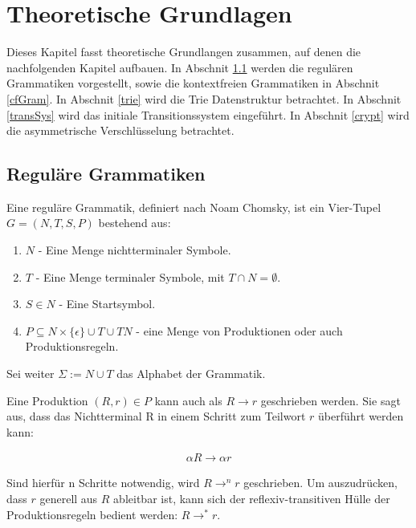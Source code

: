 \documentclass[a4paper,12pt]{report}
\begin{document}
\chapter{Theoretische Grundlagen}
\label{theo}


Dieses Kapitel fasst theoretische Grundlangen zusammen, auf denen die nachfolgenden Kapitel aufbauen. In Abschnit \ref{regGram} werden die regulären Grammatiken vorgestellt, sowie die kontextfreien Grammatiken in Abschnit \ref{cfGram}. In Abschnit \ref{trie} wird die Trie Datenstruktur betrachtet. In Abschnit \ref{transSys} wird das initiale Transitionssystem eingeführt. In Abschnit \ref{crypt} wird die asymmetrische Verschlüsselung betrachtet.

\section{Reguläre Grammatiken}
\label{regGram}
Eine reguläre Grammatik, definiert nach Noam Chomsky, ist ein Vier-Tupel 
$G = (N,T,S,P)$ bestehend aus:

\begin{enumerate}
\item $N$ - Eine Menge nichtterminaler Symbole.
\item $T$ - Eine Menge terminaler Symbole, mit $T\cap N = \emptyset$.
\item $S\in N$ - Eine Startsymbol.
\item $P \subseteq N\times \{\epsilon\}\cup T \cup TN$ - eine Menge von Produktionen oder auch Produktionsregeln.
\end{enumerate}

Sei weiter $\Sigma := N \cup T$ das Alphabet der Grammatik.

Eine Produktion $(R,r)\in P$ kann auch als $R\rightarrow r$ geschrieben werden.
Sie sagt aus, dass das Nichtterminal R in einem Schritt zum Teilwort $r$ überführt werden kann:

\begin{eqnarray}
  \alpha R \rightarrow \alpha r
\end{eqnarray}

Sind hierfür n Schritte notwendig, wird $R \rightarrow^n r$ geschrieben. Um auszudrücken, dass $r$ generell aus $R$ ableitbar ist, kann sich der reflexiv-transitiven Hülle der Produktionsregeln bedient werden: $R \rightarrow ^* r$.
\end{document}

